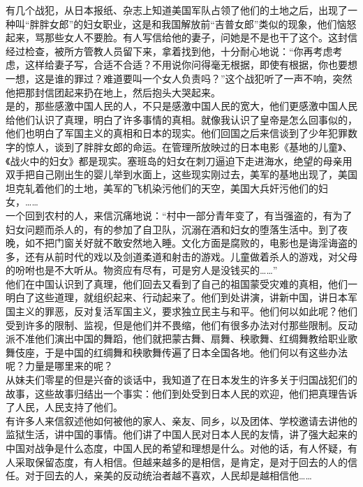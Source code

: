 有几个战犯，从日本报纸、杂志上知道美国军队占领了他们的土地之后，出现了一种叫“胖胖女郎”的妇女职业，这是和我国解放前“吉普女郎”类似的现象，他们恼怒起来，骂那些女人不要脸。有人写信给他的妻子，问她是不是也干了这个。这封信经过检查，被所方管教人员留下来，拿着找到他，十分耐心地说：“你再考虑考虑，这样给妻子写，合适不合适？不用说你问得毫无根据，即使有根据，你也要想一想，这是谁的罪过？难道要叫一个女人负责吗？”这个战犯听了一声不响，突然他把那封信团起来扔在地上，然后抱头大哭起来。\\

是的，那些感激中国人民的人，不只是感激中国人民的宽大，他们更感激中国人民给他们认识了真理，明白了许多事情的真相。就像我认识了皇帝是怎么回事似的，他们也明白了军国主义的真相和日本的现实。他们回国之后来信谈到了少年犯罪数字的惊人，谈到了胖胖女郎的命运。在管理所放映过的日本电影《基地的儿童》、《战火中的妇女》都是现实。塞班岛的妇女在刺刀逼迫下走进海水，绝望的母亲用双手把自己刚出生的婴儿举到水面上，这些现实刚过去，美军的基地出现了，美国坦克轧着他们的土地，美军的飞机染污他们的天空，美国大兵奸污他们的妇女，……\\

一个回到农村的人，来信沉痛地说：“村中一部分青年变了，有当强盗的，有为了妇女问题而杀人的，有的参加了自卫队，沉溺在酒和妇女的堕落生活中。到了夜晚，如不把门窗关好就不敢安然地入睡。文化方面是腐败的，电影也是诲淫诲盗的多，还有从前时代的戏以及剑道柔道和射击的游戏。儿童做着杀人的游戏，对父母的吩咐也是不大听从。物资应有尽有，可是穷人是没钱买的……”\\

他们在中国认识到了真理，他们回去又看到了自己的祖国蒙受灾难的真相，他们一明白了这些道理，就组织起来、行动起来了。他们到处讲演，讲新中国，讲日本军国主义的罪恶，反对复活军国主义，要求独立民主与和平。他们何以如此呢？他们受到许多的限制、监视，但是他们并不畏缩，他们有很多办法对付那些限制。反动派不准他们演出中国的舞蹈，他们就把蒙古舞、扇舞、秧歌舞、红绸舞教给职业歌舞伎座，于是中国的红绸舞和秧歌舞传遍了日本全国各地。他们何以有这些办法呢？力量是哪里来的呢？\\

从妹夫们零星的但是兴奋的谈话中，我知道了在日本发生的许多关于归国战犯们的故事，这些故事归结出一个事实：他们到处受到日本人民的欢迎，他们把真理告诉了人民，人民支持了他们。\\

有许多人来信叙述他如何被他的家人、亲友、同乡，以及团体、学校邀请去讲他的监狱生活，讲中国的事情。他们讲了中国人民对日本人民的友情，讲了强大起来的中国对战争是什么态度，中国人民的希望和理想是什么。对他的话，有人怀疑，有人采取保留态度，有人相信。但越来越多的是相信，是肯定，是对于回去的人的信任。对于回去的人，亲美的反动统治者越不喜欢，人民却是越相信他……\\

